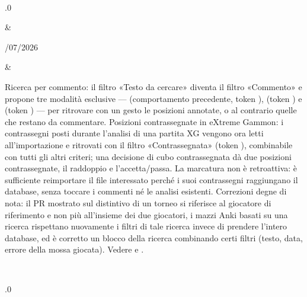 \documentclass[letterpaper,10pt,italian]{sphinxmanual}
\begin{document}
\begin{savenotes}
\begin{longtable}{}
\begin{varwidth}[t]{}
\sphinxbeforeendvarwidth
\end{varwidth}%
\\
\sphinxhline\begin{varwidth}[t]{}
.0
\sphinxbeforeendvarwidth
\end{varwidth}%
&\begin{varwidth}[t]{}
/07/2026
\sphinxbeforeendvarwidth
\end{varwidth}%
&\begin{varwidth}[t]{}
\sphinxAtStartPar
Ricerca per commento: il filtro «Testo da cercare» diventa il filtro «Commento» e propone tre modalità esclusive —  (comportamento precedente, token ),  (token ) e  (token ) — per ritrovare con un gesto le posizioni annotate, o al contrario quelle che restano da commentare. Posizioni contrassegnate in eXtreme Gammon: i contrassegni posti durante l’analisi di una partita XG vengono ora letti all’importazione e ritrovati con il filtro «Contrassegnata» (token ), combinabile con tutti gli altri criteri; una decisione di cubo contrassegnata dà due posizioni contrassegnate, il raddoppio e l’accetta/passa. La marcatura non è retroattiva: è sufficiente reimportare il file  interessato perché i suoi contrassegni raggiungano il database, senza toccare i commenti né le analisi esistenti. Correzioni degne di nota: il PR mostrato sul distintivo di un torneo si riferisce al giocatore di riferimento e non più all’insieme dei due giocatori, i mazzi Anki basati su una ricerca rispettano nuovamente i filtri di tale ricerca invece di prendere l’intero database, ed è corretto un blocco della ricerca combinando certi filtri (testo, data, errore della mossa giocata). Vedere {\hyperref[\detokenize{cmd_mode:cmd-mode}]{}} e {\hyperref[\detokenize{manuel:manuel}]{}}.
\sphinxbeforeendvarwidth
\end{varwidth}%
\\
\sphinxhline\begin{varwidth}[t]{}
.0
\sphinxbeforeendvarwidth
\end{varwidth}%

\end{longtable}
\end{savenotes}
\end{document}
